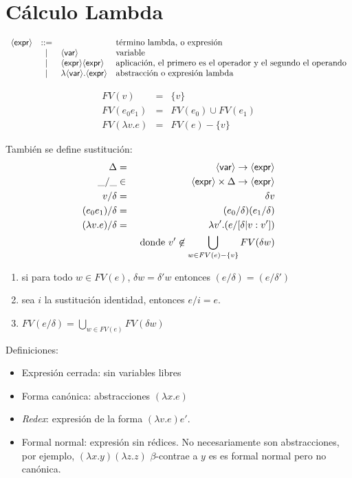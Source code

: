 \section{Cálculo Lambda}
    \[
      \begin{array}{rcll}
        \langle \mathsf{expr} \rangle &::= && \text{término lambda, o expresión} \\
            &|& \langle \mathsf{var} \rangle & \text{variable} \\
            &|& \langle \mathsf{expr} \rangle \langle \mathsf{expr} \rangle & \text{aplicación, el primero es el operador y el segundo el operando} \\
            &|& \lambda \langle \mathsf{var} \rangle.\langle \mathsf{expr} \rangle & \text{abstracción o expresión lambda} \\
      \end{array}
    \]

    \begin{eqnarray*}
      FV(v) &=& \{v\} \\
      FV(e_0 e_1) &=& FV(e_0)\cup FV(e_1) \\
      FV(\lambda v.e) &=& FV(e) - \{v\}
    \end{eqnarray*}
        
    \PN También se define sustitución:
    \begin{eqnarray*}
      \Delta &=& \langle \mathsf{var} \rangle \to \langle \mathsf{expr} \rangle \\
      \_/\_ &\in& \langle \mathsf{expr} \rangle \times \Delta \to \langle \mathsf{expr} \rangle \\
      v/\delta &=& \delta v \\
      (e_0 e_1)/\delta &=& (e_0/\delta) (e_1/\delta) \\
      (\lambda v.e)/\delta &=& \lambda v'.(e/[\delta|v:v']) \\
      && \text{ donde } v' \not\in \bigcup_{w \in FV(e) - \{v\}} FV(\delta w)
    \end{eqnarray*}
        
    \begin{property} \hfill
      \begin{enumerate}
      \item si para todo $w \in FV(e)$, $\delta w = \delta' w$ entonces
        $(e/\delta) = (e/\delta')$
      \item sea $i$ la sustitución identidad, entonces $e/i = e$.
      \item $FV(e/\delta) = \bigcup_{w\in FV(e)} FV(\delta w)$
      \end{enumerate}
    \end{property}

    \PN Definiciones:
    \begin{itemize}
      \item Expresión cerrada: sin variables libres
      \item Forma canónica: abstracciones $(\lambda x.e)$
      \item \textit{Redex}: expresión de la forma $(\lambda v.e) e'$.
      \item Formal normal: expresión sin rédices.
        \PN No necesariamente son abstracciones, por ejemplo, $(\lambda x.y) (\lambda z.z)$ $\beta$-contrae a $y$ es es formal normal pero no canónica.
    \end{itemize}
        

